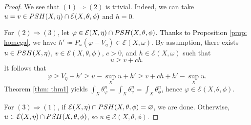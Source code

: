 \documentclass[10pt,a4paper]{amsart}
\newcommand{\PSH}{{\rm PSH}}
\begin{document}
\begin{proof}
 We see that $(1)\Rightarrow (2)$ is trivial. Indeed, we can take $u=v\in \PSH(X,\eta)\cap\mathcal{E}(X,\theta,\phi)$ and $h=0$.

For $(2)\Rightarrow (3)$, let $\varphi\in \mathcal{E}(X,\eta)\cap \PSH(X,\theta,\phi)$. Thanks to Proposition \ref{prop: homega}, we have $h'\coloneqq P_\omega(\varphi-V_\eta)\in\mathcal{E}(X,\omega)$. By assumption, there exists $u\in\PSH(X,\eta)$, $v\in\mathcal{E}(X,\theta,\phi)$, $c>0$, and $h\in\mathcal{E}(X,\omega)$ such that \[u\geq v+ ch. \]
 It follows that 
 \[\varphi\geq V_\eta+h'\geq u-\sup_X u+h'\geq v+ch+h'-\sup_X u. \]
 Theorem \ref{thm: thm1} yields $\int_X\theta_\varphi^n=\int_X\theta^n_v=\int_X\theta_\phi^n$, hence $\varphi\in\mathcal{E}(X,\theta,\phi)$.

 For $(3)\Rightarrow (1)$, if $\mathcal{E}(X,\eta)\cap\PSH(X,\theta,\phi)=\varnothing$, we are done. Otherwise, $u\in \mathcal{E}(X,\eta)\cap\PSH(X,\theta,\phi)$, so $u\in\mathcal{E}(X,\theta,\phi)$. 
\end{proof}
\end{document}
